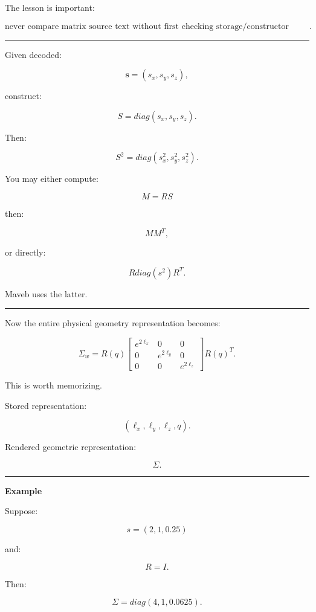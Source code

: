 The lesson is important:

\[
\boxed{
\text{never compare matrix source text without first checking storage/constructor convention}.
}
\]

\begin{center}\rule{0.5\linewidth}{0.5pt}\end{center}

Given decoded:

\[
\mathbf s=
(s_x,s_y,s_z),
\]

construct:

\[
S=
diag(s_x,s_y,s_z).
\]

Then:

\[
S^2=
diag(
s_x^2,
s_y^2,
s_z^2
).
\]

You may either compute:

\[
M=RS
\]

then:

\[
MM^T,
\]

or directly:

\[
R
diag(s^2)
R^T.
\]

Maveb uses the latter.

\begin{center}\rule{0.5\linewidth}{0.5pt}\end{center}

Now the entire physical geometry representation becomes:

\[
\boxed{
\Sigma_w
=
R(q)
\begin{bmatrix}
e^{2\ell_x}&0&0\\
0&e^{2\ell_y}&0\\
0&0&e^{2\ell_z}
\end{bmatrix}
R(q)^T.
}
\]

This is worth memorizing.

Stored representation:

\[
(\ell_x,\ell_y,\ell_z,q).
\]

Rendered geometric representation:

\[
\Sigma.
\]

\begin{center}\rule{0.5\linewidth}{0.5pt}\end{center}

\textbf{Example}

Suppose:

\[
s=(2,1,0.25)
\]

and:

\[
R=I.
\]

Then:

\[
\Sigma=
diag(
4,
1,
0.0625
).
\]

